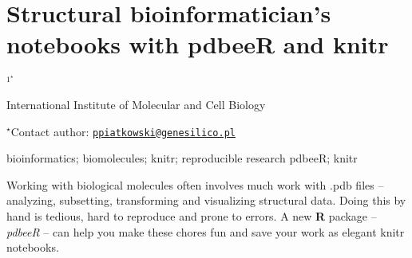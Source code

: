 \documentclass[\main/boa.tex]{subfiles}
\begin{document}
\section{Structural bioinformatician's notebooks with pdbeeR and knitr}

\begin{center}
  {\bf {}$^{1^\star}$}
\end{center}

\vskip 0.3cm

\begin{affiliations}
\begin{enumerate}
\begin{minipage}{0.915\textwidth}
\centering
\item International Institute of Molecular and Cell Biology \\[-2pt]
\end{minipage}
\end{enumerate}
$^\star$Contact author: \href{mailto:ppiatkowski@genesilico.pl}{\nolinkurl{ppiatkowski@genesilico.pl}}\\
\end{affiliations}

\vskip 0.5cm

\begin{minipage}{0.915\textwidth}
\keywords bioinformatics; biomolecules; knitr; reproducible research
\packages pdbeeR; knitr
\end{minipage}

\vskip 0.8cm

Working with biological molecules often involves much work with .pdb
files -- analyzing, subsetting, transforming and visualizing structural
data. Doing this by hand is tedious, hard to reproduce and prone to
errors. A new \textbf{R} package -- \emph{pdbeeR} -- can help you make
these chores fun and save your work as elegant knitr notebooks.
\end{document}
